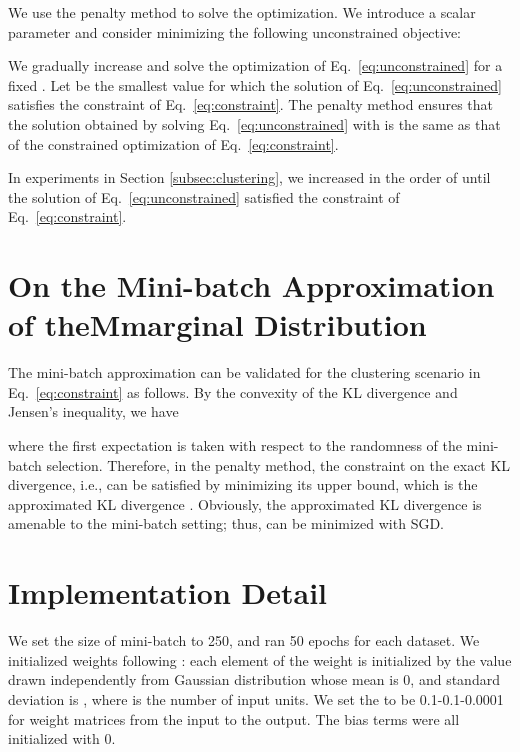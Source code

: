 \documentclass{article}
\theoremstyle{plain}
\begin{document}
We use the penalty method \citep{bertsekas1999nonlinear} to solve the optimization.
We introduce a scalar parameter  and consider minimizing the following unconstrained objective:

We gradually increase  and solve the optimization of Eq.~\eqref{eq:unconstrained} for a fixed . Let  be the smallest value for which the solution of Eq.~\eqref{eq:unconstrained} satisfies the constraint of Eq.~\eqref{eq:constraint}. The penalty method ensures that the solution obtained by solving Eq.~\eqref{eq:unconstrained} with  is the same as that of the constrained optimization of Eq.~\eqref{eq:constraint}.

In experiments in Section \ref{subsec:clustering}, we increased  in the order of  until the solution of Eq.~\eqref{eq:unconstrained} satisfied the constraint of Eq.~\eqref{eq:constraint}.

\section{On the Mini-batch Approximation of theMmarginal Distribution} \label{sec:mini-batch}
The mini-batch approximation can be validated for the clustering scenario in Eq.~\eqref{eq:constraint} as follows. 
By the convexity of the KL divergence \cite{cover2012elements} and Jensen's inequality, we have

where the first expectation is taken with respect to the randomness of the mini-batch selection. Therefore, in the penalty method, the constraint on the exact KL divergence, i.e.,  can be satisfied by minimizing its upper bound, which is the approximated KL divergence . Obviously, the approximated KL divergence is amenable to the mini-batch setting; thus, can be minimized with SGD.

\section{Implementation Detail} \label{app:implementation}
We set the size of mini-batch to 250, and ran 50 epochs for each dataset. 
We initialized weights following \citet{he2015delving}: each element of the weight is initialized by the value drawn independently from Gaussian distribution whose mean is 0, and standard deviation is , where  is the number of input units. 
We set the  to be 0.1-0.1-0.0001 for weight matrices from the input to the output. The bias terms were all initialized with 0.
\end{document}

